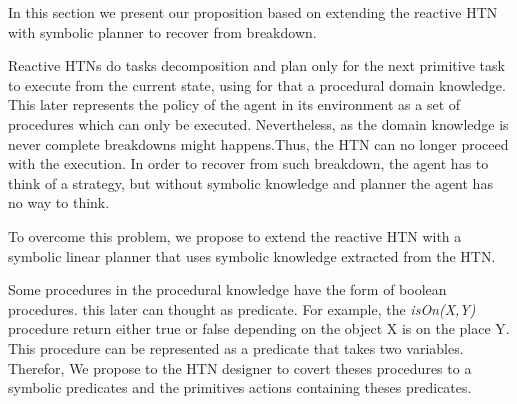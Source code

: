 \documentclass[conference]{IEEEtran}
\begin{document}
	In this section we present our proposition based on extending the reactive HTN with symbolic planner to recover from breakdown.
	\par Reactive HTNs do tasks decomposition and plan only for the next primitive task to execute from the current state, using  for that a procedural domain knowledge. This later represents the policy of the agent in its environment as a set of procedures which can only be executed. Nevertheless, as the domain knowledge is never complete breakdowns might happens.Thus, the HTN can no longer proceed with the execution. In order to recover from such breakdown, the agent has to think of a strategy, but without symbolic knowledge and planner the agent has no way to think. 
	\par To overcome this problem, we propose to extend the reactive HTN with a symbolic linear planner that uses  symbolic knowledge extracted from the HTN. 
	
	\par Some procedures in the procedural knowledge have the form of boolean procedures. this later can thought as predicate. For example, the  
	\emph{isOn(X,Y)} procedure return either true or false depending on the object X  is on the place Y. This procedure can be represented as a predicate that takes two variables. Therefor, We propose to the HTN designer to covert theses procedures  to a symbolic predicates and the primitives actions containing theses predicates. 
\end{document}
